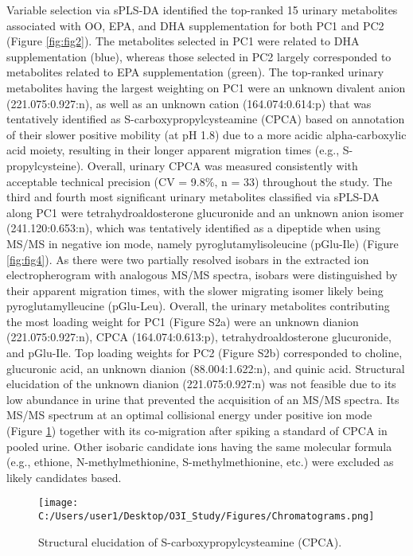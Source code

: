 \documentclass[journal=jacsat,manuscript=article]{achemso}
\begin{document}
Variable selection via sPLS-DA identified the top-ranked 15 urinary
metabolites associated with OO, EPA, and DHA supplementation for both
PC1 and PC2 (Figure \ref{fig:fig2}). The metabolites selected in PC1
were related to DHA supplementation (blue), whereas those selected in
PC2 largely corresponded to metabolites related to EPA supplementation
(green). The top-ranked urinary metabolites having the largest weighting
on PC1 were an unknown divalent anion (221.075:0.927:n), as well as an
unknown cation (164.074:0.614:p) that was tentatively identified as
S-carboxypropylcysteamine (CPCA) based on annotation of their slower
positive mobility (at pH 1.8) due to a more acidic alpha-carboxylic acid
moiety, resulting in their longer apparent migration times (e.g.,
S-propylcysteine). Overall, urinary CPCA was measured consistently with
acceptable technical precision (CV = 9.8\%, n = 33) throughout the
study. The third and fourth most significant urinary metabolites
classified via sPLS-DA along PC1 were tetrahydroaldosterone glucuronide
and an unknown anion isomer (241.120:0.653:n), which was tentatively
identified as a dipeptide when using MS/MS in negative ion mode, namely
pyroglutamylisoleucine (pGlu-Ile) (Figure \ref{fig:fig4}). As there were
two partially resolved isobars in the extracted ion electropherogram
with analogous MS/MS spectra, isobars were distinguished by their
apparent migration times, with the slower migrating isomer likely being
pyroglutamylleucine (pGlu-Leu). Overall, the urinary metabolites
contributing the most loading weight for PC1 (Figure S2a) were an
unknown dianion (221.075:0.927:n), CPCA (164.074:0.613:p),
tetrahydroaldosterone glucuronide, and pGlu-Ile. Top loading weights for
PC2 (Figure S2b) corresponded to choline, glucuronic acid, an unknown
dianion (88.004:1.622:n), and quinic acid. Structural elucidation of the
unknown dianion (221.075:0.927:n) was not feasible due to its low
abundance in urine that prevented the acquisition of an MS/MS spectra.
Its MS/MS spectrum at an optimal collisional energy under positive ion
mode (Figure \ref{fig:fig3}) together with its co-migration after
spiking a standard of CPCA in pooled urine. Other isobaric candidate
ions having the same molecular formula (e.g., ethione,
N-methylmethionine, S-methylmethionine, etc.) were excluded as likely
candidates based.

\begin{figure}
\centering
\texttt{[image: C:/Users/user1/Desktop/O3I\_Study/Figures/Chromatograms.png]}
\caption{Structural elucidation of S-carboxypropylcysteamine
(CPCA).}\label{fig:fig3}
\end{figure}
\end{document}
